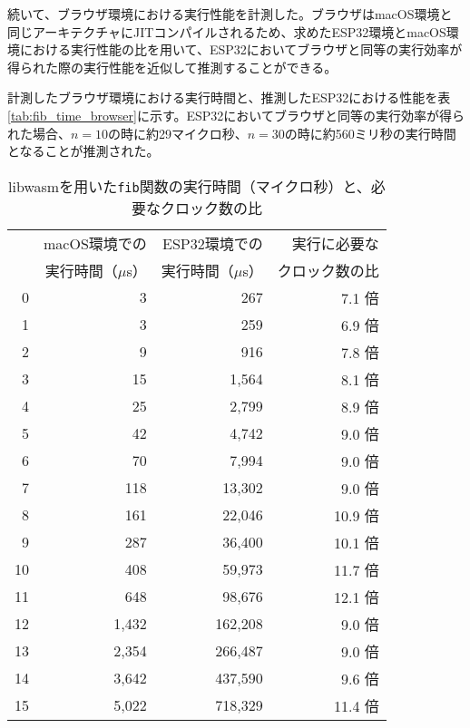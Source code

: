 続いて、ブラウザ環境における実行性能を計測した。ブラウザはmacOS環境と同じアーキテクチャにJITコンパイルされるため、求めたESP32環境とmacOS環境における実行性能の比を用いて、ESP32においてブラウザと同等の実行効率が得られた際の実行性能を近似して推測することができる。

計測したブラウザ環境における実行時間と、推測したESP32における性能を表\ref{tab:fib_time_browser}に示す。ESP32においてブラウザと同等の実行効率が得られた場合、$n=10$の時に約29マイクロ秒、$n=30$の時に約560ミリ秒の実行時間となることが推測された。

\begin{table}[htbp]
  \caption{libwasmを用いた{\tt fib}関数の実行時間（マイクロ秒）と、必要なクロック数の比}
  \label{tab:fib_time}
  \begin{center}
    \begin{tabular}{rrrr}
      \hline
      & macOS環境での & ESP32環境での & 実行に必要な \\
      & 実行時間（$\mu$s） & 実行時間（$\mu$s） & クロック数の比 \\ \hline \hline
      0  &         3 &           267 &  7.1 倍 \\ \hline
      1  &         3 &           259 &  6.9 倍 \\ \hline
      2  &         9 &           916 &  7.8 倍 \\ \hline
      3  &        15 &         1,564 &  8.1 倍 \\ \hline
      4  &        25 &         2,799 &  8.9 倍 \\ \hline
      5  &        42 &         4,742 &  9.0 倍 \\ \hline
      6  &        70 &         7,994 &  9.0 倍 \\ \hline
      7  &       118 &        13,302 &  9.0 倍 \\ \hline
      8  &       161 &        22,046 & 10.9 倍 \\ \hline
      9  &       287 &        36,400 & 10.1 倍 \\ \hline
      10 &       408 &        59,973 & 11.7 倍 \\ \hline
      11 &       648 &        98,676 & 12.1 倍 \\ \hline
      12 &     1,432 &       162,208 &  9.0 倍 \\ \hline
      13 &     2,354 &       266,487 &  9.0 倍 \\ \hline
      14 &     3,642 &       437,590 &  9.6 倍 \\ \hline
      15 &     5,022 &       718,329 & 11.4 倍 \\ \hline

\end{tabular}
\end{center}
\end{table}
